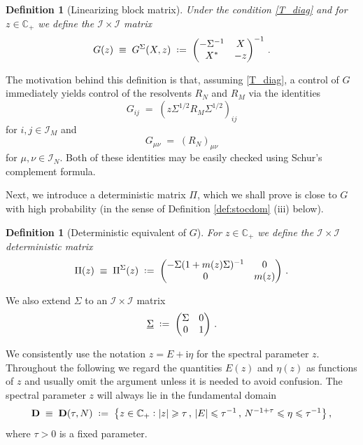 \documentclass[11pt]{article} %
\numberwithin{equation}{section}
\numberwithin{figure}{section}
\theoremstyle{plain} %
\newtheorem{definition}[theorem]{Definition}
\theoremstyle{definition} %
\newcommand{\f}[1]{\boldsymbol{\mathrm{#1}}} %
\newcommand{\bb}{\mathbb} %
\renewcommand{\cal}{\mathcal}
\newcommand{\ul}[1]{\underline{#1} \!\,} %
\newcommand{\ii}{\mathrm{i}}
\newcommand{\col}{\mathrel{\vcenter{\baselineskip0.75ex \lineskiplimit0pt \hbox{.}\hbox{.}}}}
\newcommand*{\deq}{\mathrel{\vcenter{\baselineskip0.65ex \lineskiplimit0pt \hbox{.}\hbox{.}}}=}
\renewcommand{\leq}{\leqslant}
\renewcommand{\geq}{\geqslant}
\newcommand{\p}[1]{({#1})}
\newcommand{\hb}[1]{\bigl\{{#1}\bigr\}}
\newcommand{\abs}[1]{\lvert #1 \rvert}
\begin{document}
\begin{definition}[Linearizing block matrix]
Under the condition \eqref{T_diag} and for $z \in \bb C_+$ we define the $\cal I \times \cal I$ matrix
\begin{equation} \label{def_G}
G(z) \;\equiv\; G^\Sigma(X, z) \;\deq\; \begin{pmatrix}
-\Sigma^{-1} & X
\\
X^* & -z
\end{pmatrix}^{-1}\,.
\end{equation}
\end{definition}

The motivation behind this definition is that, assuming \eqref{T_diag}, a control of $G$ immediately yields control of the resolvents $R_N$ and $R_M$
via the identities
\begin{equation} \label{G_M_ident}
G_{ij} \;=\; \p{z \Sigma^{1/2} R_M \Sigma^{1/2}}_{ij}
\end{equation}
for $i,j \in \cal I_M$ and
\begin{equation} \label{G_N_ident}
G_{\mu \nu} \;=\; (R_N)_{\mu \nu}
\end{equation}
for $\mu,\nu \in \cal I_N$. Both of these identities may be easily checked using Schur's complement formula.

Next, we introduce a deterministic matrix $\Pi$, which we shall prove is close to $G$ with high probability (in the sense of Definition \ref{def:stocdom} (iii) below).
\begin{definition}[Deterministic equivalent of $G$]
For $z \in \bb C_+$ we define the $\cal I \times \cal I$ deterministic matrix
\begin{equation} \label{def_Pi}
\Pi(z) \;\equiv\; \Pi^\Sigma(z) \;\deq\;
\begin{pmatrix}
-\Sigma(1 + m(z) \Sigma)^{-1} & 0
\\
0 & m(z)
\end{pmatrix}\,.
\end{equation}
\end{definition}
We also extend $\Sigma$ to an $\cal I \times \cal I$ matrix
\begin{equation} \label{def_ul_Sigma}
\ul \Sigma \;\deq\; \begin{pmatrix}
\Sigma & 0
\\
0 & 1
\end{pmatrix}\,.
\end{equation}

We consistently use the notation $z = E + \ii \eta$
for the spectral parameter $z$. Throughout the following we regard the quantities $E(z)$ and $\eta(z)$ as functions of $z$ and usually omit the argument unless it is needed to avoid confusion. The spectral parameter $z$ will always lie in the fundamental domain
\begin{equation} \label{def_D}
\f D \;\equiv\; \f D(\tau,N) \;\deq\; \hb{z \in \bb C_+ \col \abs{z} \geq \tau \,,\, \abs{E} \leq \tau^{-1} \,,\, N^{-1 + \tau} \leq \eta \leq \tau^{-1}}\,,
\end{equation}
where $\tau > 0$ is a fixed parameter.
\end{document}
